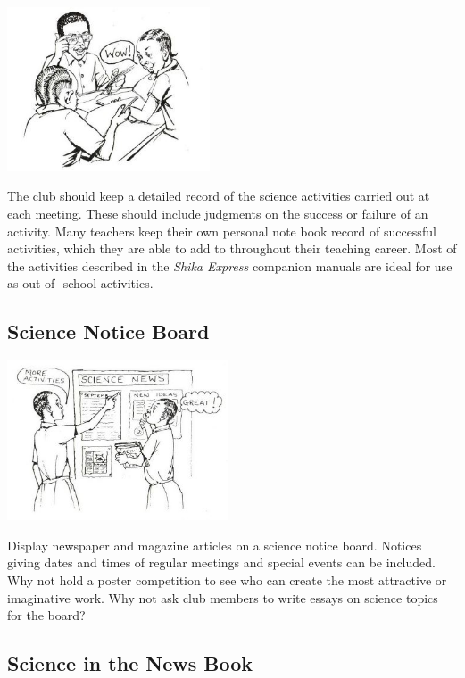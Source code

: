 \begin{multicols}{2}
\begin{center}
\includegraphics[width=0.45\textwidth]{./img/source/record-book-alt.jpg}
\end{center}

The club should keep a detailed record of the
science activities carried out at each meeting.
These should include judgments on the success
or failure of an activity. Many teachers keep
their own personal note book record of successful
activities, which they are able to add to
throughout their teaching career. Most of the
activities described in the \emph{Shika Express} companion manuals are ideal for use as out-of-
school activities.

\subsection{Science Notice Board}

\begin{center}
\includegraphics[width=0.49\textwidth]{./img/source/notice-board.jpg}
\end{center}

Display newspaper and magazine articles on
a science notice board. Notices giving dates and
times of regular meetings and special events can
be included. Why not hold a poster competition
to see who can create the most attractive or
imaginative work. Why not ask club members
to write essays on science topics for the board?

\subsection{Science in the News Book}


\end{multicols}
